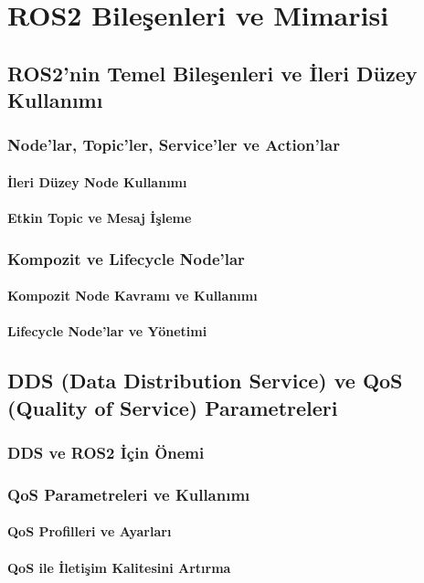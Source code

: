 \chapter{ROS2 Bileşenleri ve Mimarisi}

\section{ROS2'nin Temel Bileşenleri ve İleri Düzey Kullanımı}
\subsection{Node'lar, Topic'ler, Service'ler ve Action'lar}
\subsubsection{İleri Düzey Node Kullanımı}
\lipsum[1] %

\subsubsection{Etkin Topic ve Mesaj İşleme}
\lipsum[2] %

\subsection{Kompozit ve Lifecycle Node'lar}
\subsubsection{Kompozit Node Kavramı ve Kullanımı}
\lipsum[3] %

\subsubsection{Lifecycle Node'lar ve Yönetimi}
\lipsum[4] %

\section{DDS (Data Distribution Service) ve QoS (Quality of Service) Parametreleri}
\subsection{DDS ve ROS2 İçin Önemi}
\lipsum[5] %

\subsection{QoS Parametreleri ve Kullanımı}
\subsubsection{QoS Profilleri ve Ayarları}
\lipsum[6] %

\subsubsection{QoS ile İletişim Kalitesini Artırma}
\lipsum[7] %
